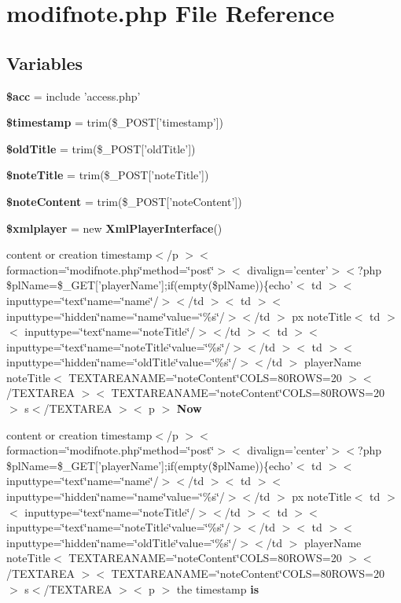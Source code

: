\section{modifnote.php File Reference}
\label{modifnote_8php}


\subsection*{Variables}
\begin{CompactItemize}
\item 
{\bf \$acc} = include 'access.php'
\item 
{\bf \$timestamp} = trim(\$\_\-POST['timestamp'])
\item 
{\bf \$old\-Title} = trim(\$\_\-POST['old\-Title'])
\item 
{\bf \$note\-Title} = trim(\$\_\-POST['note\-Title'])
\item 
{\bf \$note\-Content} = trim(\$\_\-POST['note\-Content'])
\item 
{\bf \$xmlplayer} = new {\bf Xml\-Player\-Interface}()
\item 
content or creation timestamp$<$/p $>$$<$ formaction=\char`\"{}modifnote.php\char`\"{}method=\char`\"{}post\char`\"{}$>$$<$ divalign='center'$>$$<$?php \$pl\-Name=\$\_\-GET['player\-Name'];if(empty(\$pl\-Name))\{echo'$<$ td $>$$<$ inputtype=\char`\"{}text\char`\"{}name=\char`\"{}name\char`\"{}/$>$$<$/td $>$$<$ td $>$$<$ inputtype=\char`\"{}hidden\char`\"{}name=\char`\"{}name\char`\"{}value=\char`\"{}\%s\char`\"{}/$>$$<$/td $>$ px note\-Title$<$ td $>$$<$ inputtype=\char`\"{}text\char`\"{}name=\char`\"{}note\-Title\char`\"{}/$>$$<$/td $>$$<$ td $>$$<$ inputtype=\char`\"{}text\char`\"{}name=\char`\"{}note\-Title\char`\"{}value=\char`\"{}\%s\char`\"{}/$>$$<$/td $>$$<$ td $>$$<$ inputtype=\char`\"{}hidden\char`\"{}name=\char`\"{}old\-Title\char`\"{}value=\char`\"{}\%s\char`\"{}/$>$$<$/td $>$ player\-Name note\-Title$<$ TEXTAREANAME=\char`\"{}note\-Content\char`\"{}COLS=80ROWS=20 $>$$<$/TEXTAREA $>$$<$ TEXTAREANAME=\char`\"{}note\-Content\char`\"{}COLS=80ROWS=20 $>$ s$<$/TEXTAREA $>$$<$ p $>$ {\bf Now}
\item 
content or creation timestamp$<$/p $>$$<$ formaction=\char`\"{}modifnote.php\char`\"{}method=\char`\"{}post\char`\"{}$>$$<$ divalign='center'$>$$<$?php \$pl\-Name=\$\_\-GET['player\-Name'];if(empty(\$pl\-Name))\{echo'$<$ td $>$$<$ inputtype=\char`\"{}text\char`\"{}name=\char`\"{}name\char`\"{}/$>$$<$/td $>$$<$ td $>$$<$ inputtype=\char`\"{}hidden\char`\"{}name=\char`\"{}name\char`\"{}value=\char`\"{}\%s\char`\"{}/$>$$<$/td $>$ px note\-Title$<$ td $>$$<$ inputtype=\char`\"{}text\char`\"{}name=\char`\"{}note\-Title\char`\"{}/$>$$<$/td $>$$<$ td $>$$<$ inputtype=\char`\"{}text\char`\"{}name=\char`\"{}note\-Title\char`\"{}value=\char`\"{}\%s\char`\"{}/$>$$<$/td $>$$<$ td $>$$<$ inputtype=\char`\"{}hidden\char`\"{}name=\char`\"{}old\-Title\char`\"{}value=\char`\"{}\%s\char`\"{}/$>$$<$/td $>$ player\-Name note\-Title$<$ TEXTAREANAME=\char`\"{}note\-Content\char`\"{}COLS=80ROWS=20 $>$$<$/TEXTAREA $>$$<$ TEXTAREANAME=\char`\"{}note\-Content\char`\"{}COLS=80ROWS=20 $>$ s$<$/TEXTAREA $>$$<$ p $>$ the timestamp {\bf is}
\end{CompactItemize}


